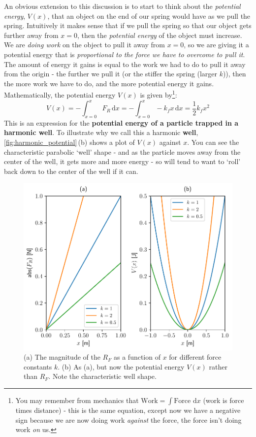 \documentclass{memoir}[11pt,oneside,a4paper,openany]
\begin{document}
An obvious extension to this discussion is to start to think about the \emph{potential energy}, $V(x)$, that an object on the end of our spring would have as we pull the spring. Intuitively it makes sense that if we pull the spring so that our object gets further away from $x=0$, then the \emph{potential energy} of the object must increase. We are \emph{doing work} on the object to pull it away from $x=0$, so we are giving it a potential energy that is \emph{proportional to the force we have to overcome to pull it}. The amount of energy it gains is equal to the work we had to do to pull it away from the origin - the further we pull it (or the stiffer the spring (larger $k$)), then the more work we have to do, and the more potential energy it gains. Mathematically, the potential energy $V(x)$ is given by\footnote{You may remember from mechanics that $\text{Work} = \int \text{Force} \,\,\mathrm{d}x$ (work is force times distance) - this is the same equation, except now we have a negative sign because we are now doing work \emph{against} the force, the force isn't doing work \emph{on} us.}:
\begin{equation}
	V(x) = -\int_{x=0}^{x} F_R \,\mathrm{d}x = -\int_{x=0}^{x} -k_fx \,\mathrm{d}x = \frac{1}{2}k_fx^2
\end{equation}
This is an expression for the \textbf{potential energy of a particle trapped in a harmonic well}. To illustrate why we call this a harmonic \textbf{well}, \autoref{fig:harmonic_potential}\,(b) shows a plot of $V(x)$ against $x$. You can see the characteristic parabolic `well' shape - and as the particle moves away from the center of the well, it gets more and more energy - so will tend to want to `roll' back down to the center of the well if it can. 

\begin{figure}
	\vspace{-0.5cm}
	\centering
	\includegraphics[width=\linewidth]{harmonic_well}
	\caption{(a) The magnitude of the $R_F$ as a function of $x$ for different force constants $k$. (b) As (a), but now the potential energy $V(x)$ rather than $R_F$. Note the characteristic well shape.}\label{fig:harmonic_potential}
\end{figure}
\end{document}
